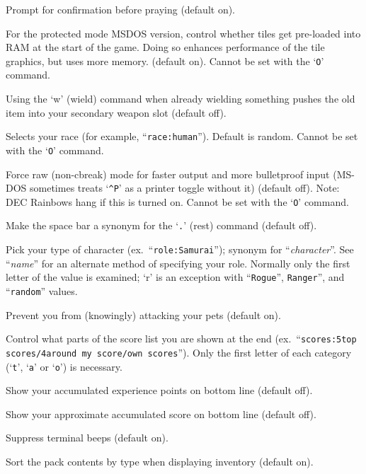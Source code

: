 \item[\ib{prayconfirm}]
Prompt for confirmation before praying (default on).
\item[\ib{preload\_tiles}]
For the protected mode MSDOS version, control whether tiles
get pre-loaded into RAM at the start of the game.  Doing so
enhances performance of the tile graphics, but uses more memory. (default on).
Cannot be set with the `{\tt O}' command.
\item[\ib{pushweapon}]
Using the `w' (wield) command when already wielding
something pushes the old item into your secondary weapon slot (default off).
\item[\ib{race}]
Selects your race (for example, ``{\tt race:human}'').  Default is random.
Cannot be set with the `{\tt O}' command.
\item[\ib{rawio}]
Force raw (non-cbreak) mode for faster output and more
bulletproof input (MS-DOS sometimes treats `{\tt \^{}P}' as a printer toggle
without it) (default off).  Note:  DEC Rainbows hang if this is turned on.
Cannot be set with the `{\tt O}' command.
\item[\ib{rest\_on\_space}]
Make the space bar a synonym for the `{\tt .}' (rest) command (default off).
\item[\ib{role}]
Pick your type of character (ex.\ ``{\tt role:Samurai}'');
synonym for ``{\it character\/}''.  See ``{\it name\/}'' for an alternate method
of specifying your role.  Normally only the first letter of the
value is examined; `r' is an exception with ``{\tt Rogue}'', {\tt Ranger}'',
and ``{\tt random}'' values.
\item[\ib{safe\_pet}]
Prevent you from (knowingly) attacking your pets (default on).
\item[\ib{scores}]
Control what parts of the score list you are shown at the end (ex.\
``{\tt scores:5top scores/4around my score/own scores}'').  Only the first
letter of each category (`{\tt t}', `{\tt a}' or `{\tt o}') is necessary.
\item[\ib{showexp}]
Show your accumulated experience points on bottom line (default off).
\item[\ib{showscore}]
Show your approximate accumulated score on bottom line (default off).
\item[\ib{silent}]
Suppress terminal beeps (default on).
\item[\ib{sortpack}]
Sort the pack contents by type when displaying inventory (default on).
\item[\ib{standout}]

